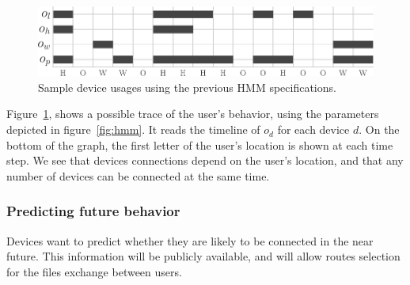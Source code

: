 \begin{figure}[t]
\centering
\includegraphics[width=\columnwidth]{figures/sample_usage.pdf}

\caption{\label{fig:sample_usage}Sample device usages using the previous HMM specifications. 
}

\end{figure}




Figure~\ref{fig:sample_usage}, shows a possible trace of the user's behavior, using the parameters depicted in figure~\ref{fig:hmm}. 
It reads the timeline of $o_{d}$ for each device $d$. On the bottom of the graph, the first letter of the user's location is shown at each time step.
We see that devices connections depend on the user's location, and that any number of devices can be connected at the same time.




\subsubsection{Predicting future behavior} %
\label{ssub:predicting_future_behavior}
Devices want to predict whether they are likely to be connected in the near future.
This information will be publicly available, and will allow routes selection for the  files exchange between users.

